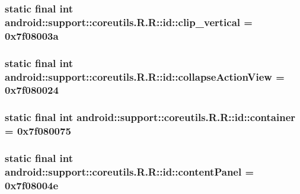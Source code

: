 \hypertarget{classandroid_1_1support_1_1coreutils_1_1_r_1_1id_1445482241ceeee01b98fc044b4033f4}{
\subsubsection[{clip\_\-vertical}]{\setlength{\rightskip}{0pt plus 5cm}static final int android::support::coreutils.R.R::id::clip\_\-vertical = 0x7f08003a}}
\label{classandroid_1_1support_1_1coreutils_1_1_r_1_1id_1445482241ceeee01b98fc044b4033f4}


\hypertarget{classandroid_1_1support_1_1coreutils_1_1_r_1_1id_ca8144f92864f632cdc1afd6b44eca66}{
\subsubsection[{collapseActionView}]{\setlength{\rightskip}{0pt plus 5cm}static final int android::support::coreutils.R.R::id::collapseActionView = 0x7f080024}}
\label{classandroid_1_1support_1_1coreutils_1_1_r_1_1id_ca8144f92864f632cdc1afd6b44eca66}


\hypertarget{classandroid_1_1support_1_1coreutils_1_1_r_1_1id_40f163210107936e1b6e39f3abf966a0}{
\subsubsection[{container}]{\setlength{\rightskip}{0pt plus 5cm}static final int android::support::coreutils.R.R::id::container = 0x7f080075}}
\label{classandroid_1_1support_1_1coreutils_1_1_r_1_1id_40f163210107936e1b6e39f3abf966a0}


\hypertarget{classandroid_1_1support_1_1coreutils_1_1_r_1_1id_8f7666b8756ce34a2ac0bd4f33aa0e45}{
\subsubsection[{contentPanel}]{\setlength{\rightskip}{0pt plus 5cm}static final int android::support::coreutils.R.R::id::contentPanel = 0x7f08004e}}
\label{classandroid_1_1support_1_1coreutils_1_1_r_1_1id_8f7666b8756ce34a2ac0bd4f33aa0e45}


